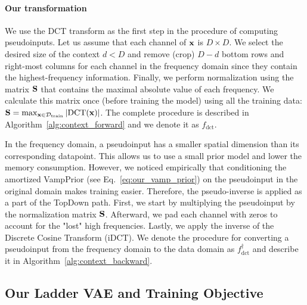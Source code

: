 \paragraph{Our transformation} We use the DCT transform as the first step in the procedure of computing pseudoinputs. 
Let us assume that each channel of ${\mathbf{x}}$ is $D\times D$. We select the desired size of the context $d < D$ and remove (crop) $D-d$ bottom rows and right-most columns for each channel in the frequency domain since they contain the highest-frequency information. 
Finally, we perform normalization using the matrix ${\mathbf{S}}$ that contains the maximal absolute value of each frequency. 
We calculate this matrix once (before training the model) using all the training data: ${\mathbf{S}} = \max_{{\mathbf{x}} \in \mathcal{D}_{\text{train}}} |\text{DCT}({\mathbf{x}})|$. 
The complete procedure is described in Algorithm~\ref{alg:context_forward} and we denote it as $f_{\text{dct}}$. 

In the frequency domain, a pseudoinput has a smaller spatial dimension than its corresponding datapoint. This allows us to use a small prior model %
and lower the memory consumption.
However, we noticed empirically that conditioning the amortized VampPrior (see Eq.~\ref{eq:our_vamp_prior}) on the pseudoinput in the original domain makes training easier. Therefore, the pseudo-inverse is applied as a part of the TopDown path. First, we start by multiplying the pseudoinput by the normalization matrix ${\mathbf{S}}$. 
Afterward, we pad each channel with zeros to account for the "lost" high frequencies. 
Lastly, we apply the inverse of the Discrete Cosine Transform (iDCT). 
We denote the procedure for converting a pseudoinput from the frequency domain to the data domain as $f^{\dagger}_{\text{dct}}$ and describe it in Algorithm~\ref{alg:context_backward}.






\subsection{Our Ladder VAE and Training Objective}

